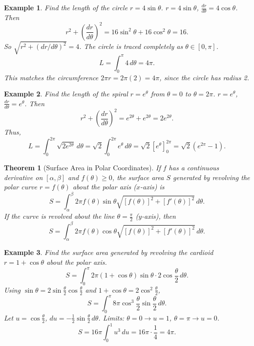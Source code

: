 \documentclass[11pt,a4paper]{article}
\newtheorem{example}{Example}
\newtheorem{theorem}{Theorem}
\begin{document}
\begin{example}
Find the length of the circle $r = 4 \sin \theta$.
$r = 4 \sin \theta$, $\frac{dr}{d\theta} = 4 \cos \theta$. Then
\[
r^2 + \left( \frac{dr}{d\theta} \right)^2 = 16 \sin^2 \theta + 16 \cos^2 \theta = 16.
\]
So $\sqrt{r^2 + (dr/d\theta)^2} = 4$. The circle is traced completely as $\theta \in [0, \pi]$.
\[
L = \int_0^{\pi} 4 \, d\theta = 4\pi.
\]
This matches the circumference $2\pi r = 2\pi (2) = 4\pi$, since the circle has radius 2.
\end{example}
\begin{example}
Find the length of the spiral $r = e^{\theta}$ from $\theta = 0$ to $\theta = 2\pi$.
$r = e^{\theta}$, $\frac{dr}{d\theta} = e^{\theta}$. Then
\[
r^2 + \left( \frac{dr}{d\theta} \right)^2 = e^{2\theta} + e^{2\theta} = 2e^{2\theta}.
\]
Thus,
\[
L = \int_0^{2\pi} \sqrt{2e^{2\theta}} \, d\theta = \sqrt{2} \int_0^{2\pi} e^{\theta} \, d\theta = \sqrt{2} [e^{\theta}]_0^{2\pi} = \sqrt{2} (e^{2\pi} - 1).
\]
\end{example}
\begin{theorem}[Surface Area in Polar Coordinates]
If $f$ has a continuous derivative on $[\alpha, \beta]$ and $f(\theta) \geq 0$, the surface area $S$ generated by revolving the polar curve $r = f(\theta)$ about the polar axis ($x$-axis) is
\[
S = \int_{\alpha}^{\beta} 2\pi f(\theta) \sin \theta \sqrt{[f(\theta)]^2 + [f'(\theta)]^2} \, d\theta.
\]
If the curve is revolved about the line $\theta = \frac{\pi}{2}$ ($y$-axis), then
\[
S = \int_{\alpha}^{\beta} 2\pi f(\theta) \cos \theta \sqrt{[f(\theta)]^2 + [f'(\theta)]^2} \, d\theta.
\]
\end{theorem}
\begin{example}
Find the surface area generated by revolving the cardioid $r = 1 + \cos \theta$ about the polar axis.
\[
S = \int_0^{\pi} 2\pi (1 + \cos \theta) \sin \theta \cdot 2\cos \frac{\theta}{2} \, d\theta.
\]
Using $\sin \theta = 2 \sin \frac{\theta}{2} \cos \frac{\theta}{2}$ and $1 + \cos \theta = 2 \cos^2 \frac{\theta}{2}$,
\[
S = \int_0^{\pi} 8\pi \cos^3 \frac{\theta}{2} \sin \frac{\theta}{2} \, d\theta.
\]
Let $u = \cos \frac{\theta}{2}$, $du = -\frac{1}{2} \sin \frac{\theta}{2} \, d\theta$. Limits: $\theta = 0 \to u = 1$, $\theta = \pi \to u = 0$.
\[
S = 16\pi \int_0^1 u^3 \, du = 16\pi \cdot \frac{1}{4} = 4\pi.
\]
\end{example}
\end{document}
